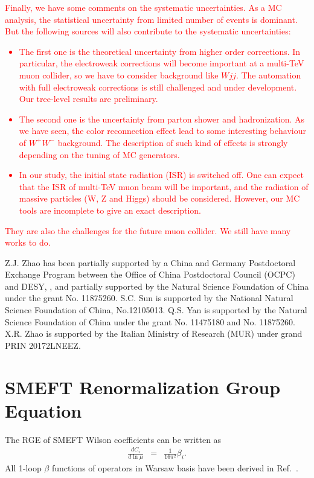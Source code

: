 \documentclass[a4paper,11pt]{article}
\begin{document}
\textcolor{red}{
Finally, we have some comments on the systematic uncertainties. 
As a MC analysis, the statistical uncertainty from limited number of events is dominant. 
But the following sources will also contribute to the systematic uncertainties: 
\begin{itemize}
  \item The first one is the theoretical uncertainty from higher order corrections. 
In particular, the electroweak corrections will become important at a multi-TeV muon collider, 
so we have to consider background like $Wjj$.
The automation with full electroweak corrections is still challenged and under development. 
Our tree-level results are preliminary.
  \item The second one is the uncertainty from parton shower and hadronization. 
As we have seen, the color reconnection effect lead to some interesting behaviour of $W^+W^-$ background. 
The description of such kind of effects is strongly depending on the tuning of MC generators.
  \item In our study, the initial state radiation (ISR) is switched off. 
One can expect that the ISR of multi-TeV muon beam will be important, 
and the radiation of massive particles (W, Z and Higgs) should be considered. 
However, our MC tools are incomplete to give an exact description. 
\end{itemize}
They are also the challenges for the future muon collider. 
We still have many works to do.
}

	\begin{acknowledgments}
                Z.J. Zhao has been partially supported by a 
                China and Germany Postdoctoral Exchange Program between the Office of China Postdoctoral Council (OCPC) and DESY,
		, and partially supported by the Natural Science
		Foundation of China under the grant No. 11875260. 
		S.C. Sun is supported by the National Natural Science Foundation of China, No.12105013.
		Q.S. Yan is supported by the Natural Science Foundation of China
		under the grant No.  11475180 and No. 11875260.
		X.R. Zhao is supported by the Italian Ministry of Research (MUR) under grand PRIN 20172LNEEZ.

	\end{acknowledgments}

\appendix
	



\section{SMEFT Renormalization Group Equation}\label{smeftrge}
The RGE of SMEFT Wilson coefficients can be written as 
\begin{eqnarray}
  \frac{dC_i}{d\ln{\mu}} &=& \frac{1}{16\pi^2}\beta_i. \label{beta:definition}
\end{eqnarray}
All 1-loop $\beta$ functions of operators in Warsaw basis have been derived in Ref.~\cite{Celis:2017hod}. 
\end{document}
